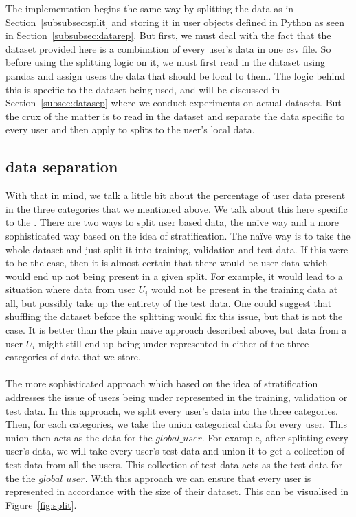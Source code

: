 \documentclass[12pt]{article}
\begin{document}
The implementation begins the same way by splitting the data as in Section~\ref{subsubsec:split} and storing it in user objects defined in Python as seen in Section~\ref{subsubsec:datarep}. But first, we must deal with the fact that the dataset provided here is a combination of every user's data in one csv file. So before using the splitting logic on it, we must first read in the dataset using pandas and assign users the data that should be local to them. The logic behind this is specific to the dataset being used, and will be discussed in Section~\ref{subsec:datasep} where we conduct experiments on actual datasets. But the crux of the matter is to read in the dataset and separate the data specific to every user and then apply to splits to the user's local data.


\subsection{data separation}
With that in mind, we talk a little bit about the percentage of user data present in the three categories that we mentioned above. We talk about this here specific to the . There are two ways to split user based data, the na\"ive way and a more sophisticated way based on the idea of stratification. The na\"ive way is to take the whole dataset and just split it into training, validation and test data. If this were to be the case, then it is almost certain that there would be user data which would end up not being present in a given split. For example, it would lead to a situation where data from user $U_i$ would not be present in the training data at all, but possibly take up the entirety of the test data. One could suggest that shuffling the dataset before the splitting would fix this issue, but that is not the case. It is better than the plain na\"ive approach described above, but data from a user $U_i$ might still end up being under represented in either of the three categories of data that we store.
\\\\
The more sophisticated approach which based on the idea of stratification addresses the issue of users being under represented in the training, validation or test data. In this approach, we split every user's data into the three categories. Then, for each categories, we take the union categorical data for every user. This union then acts as the data for the $global\_user$. For example, after splitting every user's data, we will take every user's test data and union it to get a collection of test data from all the users. This collection of test data acts as the test data for the the $global\_user$. With this approach we can ensure that every user is represented in accordance with the size of their dataset. This can be visualised in Figure~\ref{fig:split}.
\end{document}
